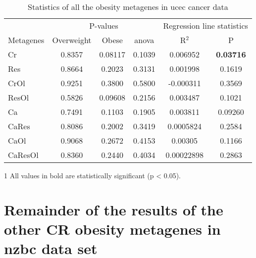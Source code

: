 \begin{appendices}
\begin{table}[htpb]
	\centering
	\caption{Statistics of all the obesity metagenes in \gls{ucec} cancer data}
	\label{tab:degmetaucec}
	\begin{threeparttable}
		\begin{tabular}{lccccc}
			& \multicolumn{3}{c}{ P-values} & \multicolumn{2}{c}{ Regression line statistics}\\
			\cmidrule(r){2-4} \cmidrule(r){5-6}
			Metagenes &  Overweight &  Obese &  \gls{anova} &  R$^2$ &  P \\
			\hline
			\hline
			\rule{0pt}{2.25ex}Cr      & 0.8357                      & 0.08117 & 0.1039             & 0.006952   & {\bfseries 0.03716}\tnote{1}\\
            Res     & 0.8664                      & 0.2023  & 0.3131             & 0.001998   & 0.1619              \\
            CrOl    & 0.9251                      & 0.3800  & 0.5800             & -0.000311  & 0.3569              \\
            ResOl   & 0.5826                      & 0.09608 & 0.2156             & 0.003487   & 0.1021              \\
            Ca      & 0.7491                      & 0.1103  & 0.1905             & 0.003811   & 0.09260             \\
            CaRes   & 0.8086                      & 0.2002  & 0.3419             & 0.0005824  & 0.2584              \\
            CaOl    & 0.9068                      & 0.2672  & 0.4153             & 0.00305    & 0.1166              \\
            CaResOl & 0.8360                      & 0.2440  & 0.4034             & 0.00022898 & 0.2863              \\
			\hline
			\hline
		\end{tabular}
		\begin{tablenotes}
			\item [1] All values in bold are statistically significant (p \textless{} 0.05).
		\end{tablenotes}
	\end{threeparttable}
\end{table}

	\section{Remainder of the results of the other CR obesity metagenes in \gls{nzbc} data set}
	\label{sec:rest_of_the_cr_ob_meta_heatmap_results_cris}


\end{appendices}
